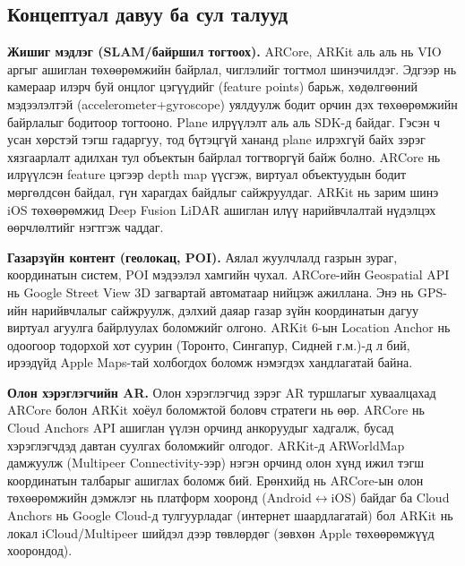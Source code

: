 \begin{sloppy}
\section*{Концептуал давуу ба сул талууд}

\textbf{Жишиг мэдлэг (SLAM/байршил тогтоох).} ARCore, ARKit аль аль нь VIO аргыг ашиглан төхөөрөмжийн байрлал, чиглэлийг тогтмол шинэчилдэг. Эдгээр нь камераар илэрч буй онцлог цэгүүдийг (feature points) барьж, хөдөлгөөний мэдээлэлтэй (accelerometer+gyroscope) уялдуулж бодит орчин дэх төхөөрөмжийн байрлалыг бодитоор тогтооно. Plane илрүүлэлт аль аль SDK-д байдаг. Гэсэн ч усан хөрстэй тэгш гадаргуу, тод бүтэцгүй хананд plane илрэхгүй байх зэрэг хязгаарлалт адилхан тул объектын байрлал тогтворгүй байж болно. ARCore нь илрүүлсэн feature цэгээр depth map үүсгэж, виртуал объектуудын бодит мөргөлдсөн байдал, гүн харагдах байдлыг сайжруулдаг. ARKit нь зарим шинэ iOS төхөөрөмжид Deep Fusion LiDAR ашиглан илүү нарийвчлалтай нүдэлцэх өөрчлөлтийг нэгтгэж чаддаг.

\textbf{Газарзүйн контент (геолокац, POI).} Аялал жуулчлалд газрын зураг, координатын систем, POI мэдээлэл хамгийн чухал. ARCore-ийн Geospatial API нь Google Street View 3D загвартай автоматаар нийцэж ажиллана. Энэ нь GPS-ийн нарийвчлалыг сайжруулж, дэлхий даяар газар зүйн координатын дагуу виртуал агуулга байрлуулах боломжийг олгоно. ARKit 6-ын Location Anchor нь одоогоор тодорхой хот суурин (Торонто, Сингапур, Сидней г.м.)-д л бий, ирээдүйд Apple Maps-тай холбогдох боломж нэмэгдэх хандлагатай байна.

\textbf{Олон хэрэглэгчийн AR.} Олон хэрэглэгчид зэрэг AR туршлагыг хуваалцахад ARCore болон ARKit хоёул боломжтой боловч стратеги нь өөр. ARCore нь Cloud Anchors API ашиглан үүлэн орчинд анкоруудыг хадгалж, бусад хэрэглэгчдэд давтан суулгах боломжийг олгодог. ARKit-д ARWorldMap дамжуулж (Multipeer Connectivity-ээр) нэгэн орчинд олон хүнд ижил тэгш координатын талбарыг ашиглах боломж бий. Ерөнхийд нь ARCore-ын олон төхөөрөмжийн дэмжлэг нь платформ хооронд (Android$\leftrightarrow$iOS) байдаг ба Cloud Anchors нь Google Cloud-д тулгуурладаг (интернет шаардлагатай) бол ARKit нь локал iCloud/Multipeer шийдэл дээр төвлөрдөг (зөвхөн Apple төхөөрөмжүүд хоорондод).


\end{sloppy}
